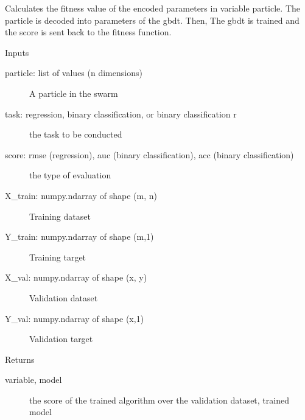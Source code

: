 \documentclass[letterpaper,10pt,english]{sphinxmanual}
\begin{document}
\begin{fulllineitems}
\begin{fulllineitems}
\end{fulllineitems}


\begin{fulllineitems}
\label{\detokenize{index:pspso.pspso.forward_prop_gbdt}}
Calculates the fitness value of the encoded parameters in variable particle.
The particle is decoded into parameters of the gbdt. Then, The gbdt is trained and the score is sent back to the fitness function.

Inputs
\begin{description}
\item[{particle: list of values (n dimensions)}] \leavevmode
A particle in the swarm

\item[{task: regression, binary classification, or binary classification r}] \leavevmode
the task to be conducted

\item[{score: rmse (regression), auc (binary classification), acc (binary classification)}] \leavevmode
the type of evaluation

\item[{X\_train: numpy.ndarray of shape (m, n)}] \leavevmode
Training dataset

\item[{Y\_train: numpy.ndarray of shape (m,1)}] \leavevmode
Training target

\item[{X\_val: numpy.ndarray of shape (x, y)}] \leavevmode
Validation dataset

\item[{Y\_val: numpy.ndarray of shape (x,1)}] \leavevmode
Validation target

\end{description}

Returns
\begin{description}
\item[{variable, model}] \leavevmode
the score of the trained algorithm over the validation dataset, trained model

\end{description}


\end{fulllineitems}
\end{fulllineitems}
\end{document}
